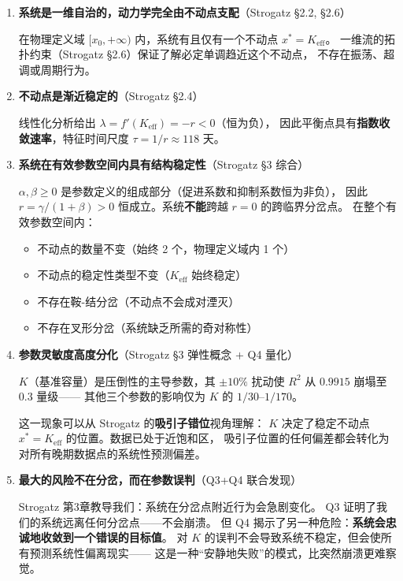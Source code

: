 \documentclass[12pt,a4paper]{article}
\begin{document}
\begin{enumerate}[label=\textbf{\arabic*.}]

\item \textbf{系统是一维自治的，动力学完全由不动点支配}（Strogatz \S2.2, \S2.6）

在物理定义域 $[x_0, +\infty)$ 内，系统有且仅有一个不动点 $x^* = K_{\text{eff}}$。
一维流的拓扑约束（Strogatz \S2.6）保证了解必定单调趋近这个不动点，
不存在振荡、超调或周期行为。

\item \textbf{不动点是渐近稳定的}（Strogatz \S2.4）

线性化分析给出 $\lambda = f'(K_{\text{eff}}) = -r < 0$（恒为负），
因此平衡点具有\textbf{指数收敛速率}，特征时间尺度 $\tau = 1/r \approx 118$ 天。

\item \textbf{系统在有效参数空间内具有结构稳定性}（Strogatz \S3 综合）

$\alpha, \beta \geq 0$ 是参数定义的组成部分（促进系数和抑制系数恒为非负），
因此 $r = \gamma/(1+\beta) > 0$ 恒成立。系统\textbf{不能}跨越 $r = 0$ 的跨临界分岔点。
在整个有效参数空间内：
\begin{itemize}
  \item 不动点的数量不变（始终 2 个，物理定义域内 1 个）
  \item 不动点的稳定性类型不变（$K_{\text{eff}}$ 始终稳定）
  \item 不存在鞍-结分岔（不动点不会成对湮灭）
  \item 不存在叉形分岔（系统缺乏所需的奇对称性）
\end{itemize}

\item \textbf{参数灵敏度高度分化}（Strogatz \S3 弹性概念 + Q4 量化）

$K$（基准容量）是压倒性的主导参数，其 $\pm 10\%$ 扰动使 $R^2$ 从 $0.9915$ 崩塌至 $0.3$ 量级——
其他三个参数的影响仅为 $K$ 的 $1/30$--$1/170$。

这一现象可以从 Strogatz 的\textbf{吸引子错位}视角理解：
$K$ 决定了稳定不动点 $x^* = K_{\text{eff}}$ 的位置。数据已处于近饱和区，
吸引子位置的任何偏差都会转化为对所有晚期数据点的系统性预测偏差。

\item \textbf{最大的风险不在分岔，而在参数误判}（Q3+Q4 联合发现）

Strogatz 第3章教导我们：系统在分岔点附近行为会急剧变化。
Q3 证明了我们的系统远离任何分岔点——不会崩溃。
但 Q4 揭示了另一种危险：\textbf{系统会忠诚地收敛到一个错误的目标值}。
对 $K$ 的误判不会导致系统不稳定，但会使所有预测系统性偏离现实——
这是一种``安静地失败''的模式，比突然崩溃更难察觉。


\end{enumerate}
\end{document}
